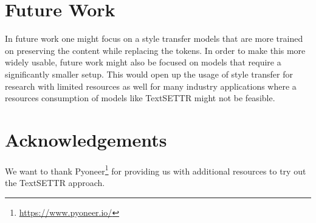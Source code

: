 \documentclass[twocolumn]{tum-article}
\begin{document}
\section{Future Work}
In future work one might focus on a style transfer models that are more trained on preserving the content while replacing the tokens. In order to make this more widely usable, future work might also be focused on models that require a significantly smaller setup. This would open up the usage of style transfer for research with limited resources as well for many industry applications where a resources consumption of models like TextSETTR might not be feasible.
\section*{Acknowledgements}
We want to thank Pyoneer\footnote{\url{https://www.pyoneer.io/}} for providing us with additional resources to try out the TextSETTR approach. 


\end{document}
